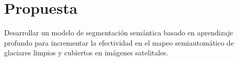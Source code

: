 \section{Propuesta}
\label{sec:Propuesta}

Desarrollar un modelo de segmentación semántica basado en aprendizaje profundo para incrementar la efectividad en el mapeo semiautomático de glaciares limpios y cubiertos en imágenes satelitales.